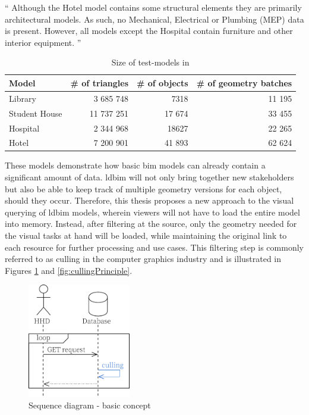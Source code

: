 \enquote{
	Although the Hotel model contains some structural elements they are primarily architectural models. As such, no Mechanical, Electrical or Plumbing (MEP) data is present. However, all models except the Hospital contain furniture and other interior equipment.
} \parencite{Johansson2015}

\begin{table}[h]
	\centering
	\begin{tabular}{@{}lrrr@{}}
		\toprule
		Model         & \multicolumn{1}{l}{\# of  triangles} & \multicolumn{1}{l}{\# of objects} & \multicolumn{1}{l}{\# of geometry batches} \\ \midrule
		Library       & 3 685 748                            & 7318                              & 11 195                                     \\
		Student House & 11 737 251                           & 17 674                            & 33 455                                     \\
		Hospital      & 2 344 968                            & 18627                             & 22 265                                     \\
		Hotel         & 7 200 901                            & 41 893                            & 62 624                                     \\ \bottomrule
	\end{tabular}
	\caption{Size of test-models in \cite{Johansson2015}}
	\label{tab:sizeModels}
\end{table}

These models demonstrate how basic \ac{bim} models can already contain a significant amount of data. \ac{ldbim} will not only bring together new stakeholders but also be able to keep track of multiple geometry versions for each object, should they occur. Therefore, this thesis proposes a new approach to the visual querying of \ac{ldbim} models, wherein viewers will not have to load the entire model into memory. Instead, after filtering at the source, only the geometry needed for the visual tasks at hand will be loaded, while maintaining the original link to each resource for further processing and use cases. This filtering step is commonly referred to as culling in the computer graphics industry and is illustrated in Figures \ref{fig:firstIdea} and \ref{fig:cullingPrinciple}.

\begin{figure}[h]
	\centering
	\includegraphics[width=0.4\textwidth]{figures/pdf/first idea.pdf}
	\caption{Sequence diagram - basic concept}
	\label{fig:firstIdea}
\end{figure}

